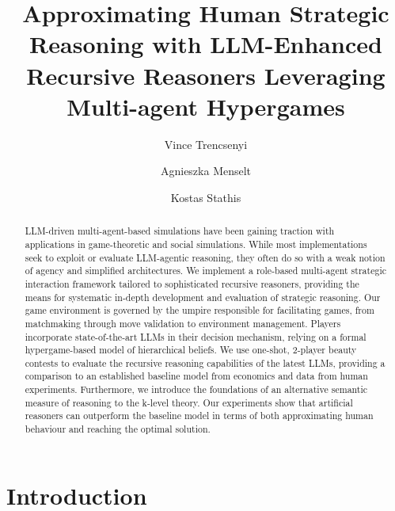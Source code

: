 \documentclass[runningheads]{llncs}
\begin{document}
\title{Approximating Human Strategic Reasoning with LLM-Enhanced Recursive Reasoners Leveraging Multi-agent Hypergames}


\author{Vince Trencsenyi \and
Agnieszka Menselt \and
Kostas Stathis}



\maketitle

\begin{abstract}
LLM-driven multi-agent-based simulations have been gaining traction with applications in game-theoretic and social simulations. While most implementations seek to exploit or evaluate LLM-agentic reasoning, they often do so with a weak notion of agency and simplified architectures.
We implement a role-based multi-agent strategic interaction framework tailored to sophisticated recursive reasoners, providing the means for systematic in-depth development and evaluation of strategic reasoning. Our game environment is governed by the umpire responsible for facilitating games, from matchmaking through move validation to environment management. Players incorporate state-of-the-art LLMs in their decision mechanism, relying on a formal hypergame-based model of hierarchical beliefs. We use one-shot, 2-player beauty contests to evaluate the recursive reasoning capabilities of the latest LLMs, providing a comparison to an established baseline model from economics and data from human experiments. Furthermore, we introduce the foundations of an alternative semantic measure of reasoning to the k-level theory. Our experiments show that artificial reasoners can outperform the baseline model in terms of both approximating human behaviour and reaching the optimal solution.

\end{abstract}


\section{Introduction}
\end{document}
